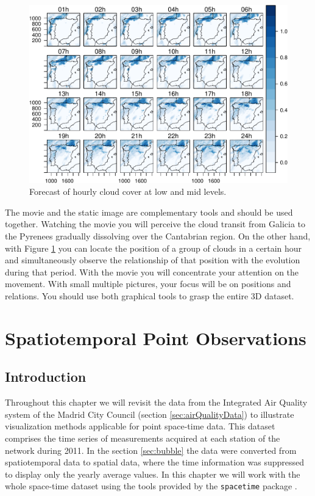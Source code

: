 \documentclass[smallroyalvopaper]{memoir}
\begin{document}
\begin{figure}[htb]
\centering
\includegraphics[width=.9\linewidth]{figs/cft.pdf}
\caption{\label{fig:cft}Forecast of hourly cloud cover at low and mid levels.}
\end{figure}

The movie and the static image are complementary tools and should be
used together. Watching the movie you will perceive the cloud transit
from Galicia to the Pyrenees gradually dissolving over the Cantabrian
region. On the other hand, with Figure \ref{fig:cft} you can locate the
position of a group of clouds in a certain hour and simultaneously
observe the relationship of that position with the evolution during
that period. With the movie you will concentrate your attention on the
movement. With small multiple pictures, your focus will be on
positions and relations. You should use both graphical tools to grasp
the entire 3D dataset.

\chapter{Spatiotemporal Point Observations}
\label{sec:orgbe4ced7}
\label{cha:pointsST}

\section{Introduction}
\label{sec-1}
Throughout this chapter we will revisit the data from the Integrated
Air Quality system of the Madrid City Council (section
\ref{sec:airQualityData}) to illustrate visualization methods
applicable for point space-time data. This dataset comprises the time
series of measurements acquired at each station of the network
during 2011. In the section \ref{sec:bubble} the data were converted
from spatiotemporal data to spatial data, where the time
information was suppressed to display only the yearly average
values. In this chapter we will work with the whole space-time dataset
using the tools provided by the \texttt{spacetime} package
\cite{Pebesma2012}.
\end{document}
